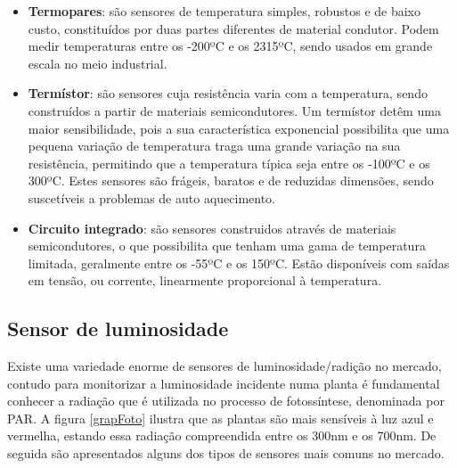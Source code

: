 \begin{itemize}
	\item \textbf{Termopares}: são sensores de temperatura simples, robustos e de baixo custo, constituídos por duas partes diferentes de material condutor. Podem medir temperaturas entre os -200ºC e os 2315ºC, sendo usados em grande escala no meio industrial\cite{REOTEMPInstrumentCorporation}. 
	 
	
	\item \textbf{Termístor}: são sensores cuja resistência varia com a temperatura, sendo construídos a partir de materiais semicondutores. Um termístor detêm uma maior sensibilidade, pois a sua característica exponencial possibilita que uma pequena variação de temperatura traga uma grande variação na sua resistência, permitindo que a temperatura típica seja entre os -100ºC e os 300ºC. Estes sensores são frágeis, baratos e de reduzidas dimensões, sendo suscetíveis a problemas de auto aquecimento\cite{TemperatureSensors}.
	

	\item \textbf{Circuito integrado}: são sensores construidos através de materiais semicondutores, o que possibilita que tenham uma gama de temperatura limitada, geralmente entre os -55ºC e os 150ºC. 	Estão disponíveis com saídas em tensão, ou corrente, linearmente proporcional à temperatura. 


\end{itemize}





\subsection{Sensor de luminosidade }




Existe uma variedade enorme de sensores de luminosidade/radição no mercado, contudo para monitorizar a luminosidade incidente numa planta é fundamental conhecer a radiação que é utilizada no processo de fotossíntese, denominada por \ac{PAR}. A figura \ref{grapFoto} ilustra que as plantas são mais sensíveis à luz azul e vermelha, estando essa radiação compreendida entre os  300nm e os 700nm. De seguida são apresentados alguns dos tipos de sensores mais comuns no mercado. 






